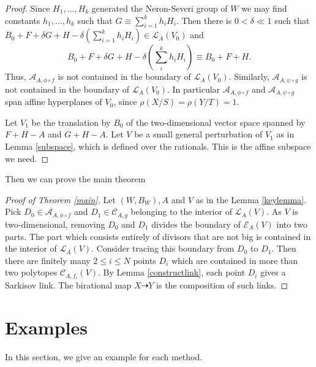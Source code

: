 \documentclass[11pt]{amsart}
\begin{document}
\begin{proof}
  Since $H_{1},\ldots ,H_{k}$ generated the Neron-Severi group of $W$ we may find constants $h_{1},\ldots ,h_{k}$ such that $G \equiv \sum^{k}_{i=1} h_{i}H_{i}$. Then there is $0< \delta\ll 1$ such that  $B_{0}+F+\delta G+H- \delta(\sum_{i=1}^{k} h_{i}H_{i}) \in \mathcal{L}_{A}(V_{0})$ and
  \[
    B_{0}+F+\delta G+H-\delta (\sum_i^k h_{i}H_{i}) \equiv B_{0}+F+H
    .\]
  Thus, $\mathcal{A}_{A,\phi\circ f}$ is not contained in the boundary of $\mathcal{L}_{A}(V_{0})$. Similarly, $\mathcal{A}_{A,\psi\circ g}$ is not contained in the boundary of $\mathcal{L}_{A}(V_{0})$. In particular $\mathcal{A}_{A,\phi\circ f}$ and   $\mathcal{A}_{A,\psi\circ g}$ span affine hyperplanes of $V_{0}$, since $\rho(X/S)=\rho(Y/T)=1$.

  Let $V_{1}$ be the translation by $B_{0}$ of the two-dimensional vector space spanned by $F+H-A$ and $G+H-A$. Let $V$ be a small general perturbation of $V_{1}$ as in Lemma \ref{subspace}, which is defined over the rationals. This is the affine subspace we need.
\end{proof}
Then we can prove the main theorem

\begin{proof}[Proof of Theorem \ref{main}]
  Let $(W,B_{W}),A $ and $V$ as in the Lemma \ref{keylemma}.  Pick $ D_{0} \in \mathcal{A}_{A,\phi\circ f} $  and $ D_1\in \mathcal{C}_{A,g} $ belonging to the interior of $ \mathcal{L}_A(V) $. As $ V $ is two-dimensional, removing $ D_0 $ and $ D_1 $ divides the boundary of $ \mathcal{E}_A(V) $ into two parts. The part which consists entirely of divisors that are not big is contained in the interior of $ \mathcal{L}_A(V) $. Consider tracing this boundary from $ D_0 $ to $ D_1 $. Then there are finitely many $ 2\leqslant i\leqslant N $ points $ D_i $ which are contained in more than two polytopes $ \mathcal{C}_{A,f_i}(V) $. By Lemma \ref{constructlink},  each point $ D_i $ gives a Sarkisov link.  The birational map $X \dashrightarrow Y$ is the composition of such links.
\end{proof}

\section{Examples}
In this section, we give an example for each method.
\end{document}
